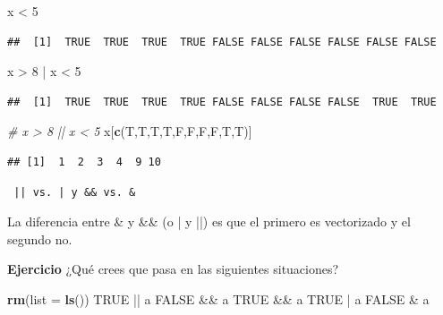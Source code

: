 \documentclass[]{article}
\newenvironment{Shaded}{\begin{snugshade}}{\end{snugshade}}
\newcommand{\KeywordTok}[1]{\textcolor[rgb]{0.13,0.29,0.53}{\textbf{{#1}}}}
\newcommand{\DataTypeTok}[1]{\textcolor[rgb]{0.13,0.29,0.53}{{#1}}}
\newcommand{\DecValTok}[1]{\textcolor[rgb]{0.00,0.00,0.81}{{#1}}}
\newcommand{\StringTok}[1]{\textcolor[rgb]{0.31,0.60,0.02}{{#1}}}
\newcommand{\CommentTok}[1]{\textcolor[rgb]{0.56,0.35,0.01}{\textit{{#1}}}}
\newcommand{\OtherTok}[1]{\textcolor[rgb]{0.56,0.35,0.01}{{#1}}}
\newcommand{\NormalTok}[1]{{#1}}
\begin{document}
\begin{Shaded}
\begin{Highlighting}[]
\NormalTok{x <}\StringTok{ }\DecValTok{5}
\end{Highlighting}
\end{Shaded}

\begin{verbatim}
##  [1]  TRUE  TRUE  TRUE  TRUE FALSE FALSE FALSE FALSE FALSE FALSE
\end{verbatim}

\begin{Shaded}
\begin{Highlighting}[]
\NormalTok{x >}\StringTok{ }\DecValTok{8} \NormalTok{|}\StringTok{ }\NormalTok{x <}\StringTok{ }\DecValTok{5}
\end{Highlighting}
\end{Shaded}

\begin{verbatim}
##  [1]  TRUE  TRUE  TRUE  TRUE FALSE FALSE FALSE FALSE  TRUE  TRUE
\end{verbatim}

\begin{Shaded}
\begin{Highlighting}[]
\CommentTok{# x > 8 || x < 5}
\NormalTok{x[}\KeywordTok{c}\NormalTok{(T,T,T,T,F,F,F,F,T,T)]}
\end{Highlighting}
\end{Shaded}

\begin{verbatim}
## [1]  1  2  3  4  9 10
\end{verbatim}

\begin{nota}
\begin{verbatim} || vs. | y && vs. & \end{verbatim}
La diferencia entre \& y \&\& (o | y ||) es que el primero es vectorizado y el
segundo no.
\end{nota}

\textbf{Ejercicio} ¿Qué crees que pasa en las siguientes situaciones?

\begin{Shaded}
\begin{Highlighting}[]
\KeywordTok{rm}\NormalTok{(}\DataTypeTok{list =} \KeywordTok{ls}\NormalTok{())}
\OtherTok{TRUE} \NormalTok{||}\StringTok{ }\NormalTok{a}
\OtherTok{FALSE} \NormalTok{&&}\StringTok{ }\NormalTok{a}
\OtherTok{TRUE} \NormalTok{&&}\StringTok{ }\NormalTok{a}
\OtherTok{TRUE} \NormalTok{|}\StringTok{ }\NormalTok{a}
\OtherTok{FALSE} \NormalTok{&}\StringTok{ }\NormalTok{a}
\end{Highlighting}
\end{Shaded}
\end{document}
